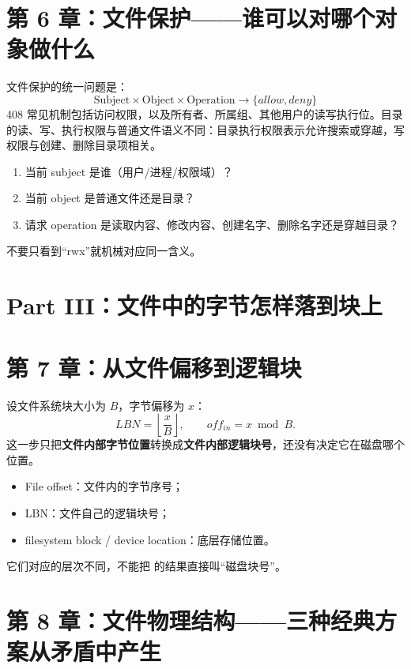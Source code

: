 \documentclass[11pt,a4paper]{ctexart}
\newcommand{\kw}[1]{\textbf{#1}}
\newcommand{\code}[1]{\texttt{\detokenize{#1}}}
\begin{document}
\section{第 6 章：文件保护——谁可以对哪个对象做什么}
文件保护的统一问题是：
\[
\boxed{\text{Subject}\times\text{Object}\times\text{Operation}\to\{allow,deny\}}
\]
408 常见机制包括访问权限，以及所有者、所属组、其他用户的读写执行位。目录的读、写、执行权限与普通文件语义不同：目录执行权限表示允许搜索或穿越，写权限与创建、删除目录项相关。

\begin{method}[保护题三问]
\begin{enumerate}
  \item 当前 subject 是谁（用户/进程/权限域）？
  \item 当前 object 是普通文件还是目录？
  \item 请求 operation 是读取内容、修改内容、创建名字、删除名字还是穿越目录？
\end{enumerate}
不要只看到“rwx”就机械对应同一含义。
\end{method}

\section{Part III：文件中的字节怎样落到块上}

\section{第 7 章：从文件偏移到逻辑块}
设文件系统块大小为 $B$，字节偏移为 $x$：
\[
\boxed{LBN=\left\lfloor\frac{x}{B}\right\rfloor},\qquad
\boxed{off_{in}=x\bmod B}.
\]
这一步只把\kw{文件内部字节位置}转换成\kw{文件内部逻辑块号}，还没有决定它在磁盘哪个位置。

\begin{warn}[三个“地址”不要混]
\begin{itemize}
  \item File offset：文件内的字节序号；
  \item LBN：文件自己的逻辑块号；
  \item filesystem block / device location：底层存储位置。
\end{itemize}
它们对应的层次不同，不能把 \code{offset/B} 的结果直接叫“磁盘块号”。
\end{warn}

\section{第 8 章：文件物理结构——三种经典方案从矛盾中产生}
\end{document}
